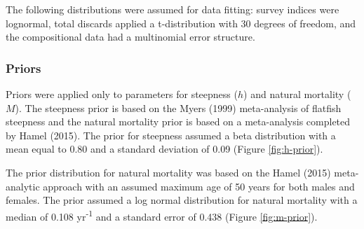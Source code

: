 \documentclass[11pt,
  english,
  a4paper,
]{article}
\begin{document}
\leavevmode\tagmcend\tagstructend\par


The following distributions were assumed for data fitting: survey indices were lognormal, total discards applied a t-distribution with 30 degrees of freedom, and the compositional data had a multinomial error structure.

\leavevmode\tagmcend\tagstructend\par


\hypertarget{priors}{%
\subsubsection{Priors}\label{priors}}

\leavevmode\tagmcend\tagstructend


Priors were applied only to parameters for steepness ({\(h\)\leavevmode\tagmcend\tagstructend}) and natural mortality ({\(M\)\leavevmode\tagmcend\tagstructend}). The steepness prior is based on the Myers {(1999)\leavevmode\tagmcend\tagstructend} meta-analysis of flatfish steepness and the natural mortality prior is based on a meta-analysis completed by Hamel {(2015)\leavevmode\tagmcend\tagstructend}. The prior for steepness assumed a beta distribution with a mean equal to 0.80 and a standard deviation of 0.09 (Figure \ref{fig:h-prior}).

\leavevmode\tagmcend\tagstructend\par


The prior distribution for natural mortality was based on the Hamel {(2015)\leavevmode\tagmcend\tagstructend} meta-analytic approach with an assumed maximum age of 50 years for both males and females. The prior assumed a log normal distribution for natural mortality with a median of 0.108 yr\textsuperscript{-1} and a standard error of 0.438 (Figure \ref{fig:m-prior}).

\leavevmode\tagmcend\tagstructend\par
\end{document}
